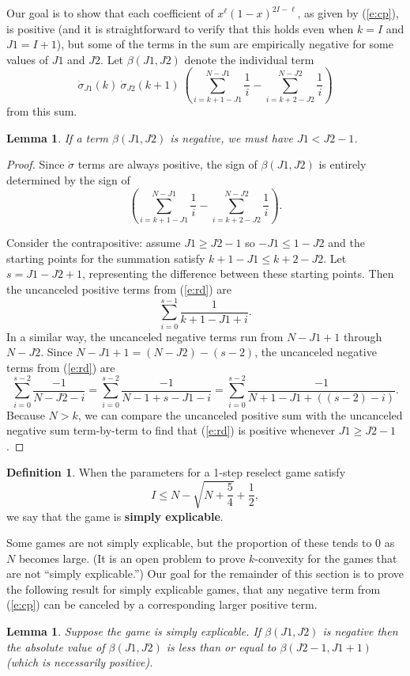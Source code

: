 \documentclass[11pt]{amsart}   %
\newtheorem{lemma}[theorem]{Lemma}
\theoremstyle{definition}
\newtheorem{definition}[theorem]{Definition}
\theoremstyle{remark}
\numberwithin{equation}{section}
\theoremstyle{theorem}
\begin{document}
Our goal is to show that each coefficient of $x^\ell (1-x)^{2I-\ell}$, as given
by (\ref{e:cp}), is positive (and it is straightforward to verify that this
holds even when $k = I$ and $J1 = I+1$), but some of the terms in the sum are
empirically negative for some values of $J1$ and $J2$.  Let $\beta(J1,
J2)$ denote the individual term 
\[ \dot\sigma_{J1}(k) \ \dot\sigma_{J2}(k+1) \ \left( \sum_{i=k+1-J1}^{N-J1} \frac{1}{i} - \sum_{i=k+2-J2}^{N-J2} \frac{1}{i} \right) \] 
from this sum.

\begin{lemma}\label{l:b1}
If a term $\beta(J1, J2)$ is negative, we must have $J1 < J2-1$.
\end{lemma}
\begin{proof}
    Since $\dot\sigma$ terms are always positive, the sign of $\beta(J1, J2)$ is entirely determined by the sign of 
    \begin{equation}\label{e:rd}
    \left( \sum_{i=k+1-J1}^{N-J1} \frac{1}{i} - \sum_{i=k+2-J2}^{N-J2} \frac{1}{i} \right).
    \end{equation}

    Consider the contrapositive:  assume $J1 \geq J2-1$ so $-J1 \leq 1-J2$ and the starting points for the summation satisfy $k+1-J1 \leq k+2-J2$.  
    Let $s = J1-J2+1$, representing the difference between these starting points.  Then the uncanceled positive terms from (\ref{e:rd}) are
    \[ \sum_{i=0}^{s-1} \frac{1}{k+1-J1 + i}. \]
    In a similar way, the uncanceled negative terms run from $N-J1+1$ through $N-J2$.  Since $N-J1+1 = (N-J2)-(s-2)$, the uncanceled negative terms from (\ref{e:rd}) are
    \[ \sum_{i=0}^{s-2} \frac{-1}{N-J2-i} = \sum_{i=0}^{s-2} \frac{-1}{N-1+s-J1-i} = \sum_{i=0}^{s-2} \frac{-1}{N+1-J1 + \left((s-2)-i\right)}. \]
    Because $N > k$, we can compare the uncanceled positive sum with the uncanceled negative sum term-by-term to find that (\ref{e:rd})
    is positive whenever $J1 \geq J2-1$.
\end{proof}

\begin{definition}
When the parameters for a 1-step reselect game satisfy
\[ I \leq N - \sqrt{N+\frac{5}{4}} + \frac{1}{2}, \]
we say that the game is {\bf simply explicable}.
\end{definition}

Some games are not simply explicable, but the proportion of these tends to $0$ as $N$ becomes large.  (It is an open problem to prove $k$-convexity for the games that are not ``simply explicable.'')  Our goal for the remainder of this section is to prove the following result for simply explicable games, that any negative term from (\ref{e:cp}) can be canceled by a corresponding larger positive term.
\begin{lemma}\label{l:cancel}
Suppose the game is simply explicable.  If $\beta(J1,J2)$ is negative then the absolute value of $\beta(J1,J2)$ is less than or equal to $\beta(J2-1, J1+1)$ (which is necessarily positive).
\end{lemma}
\end{document}
